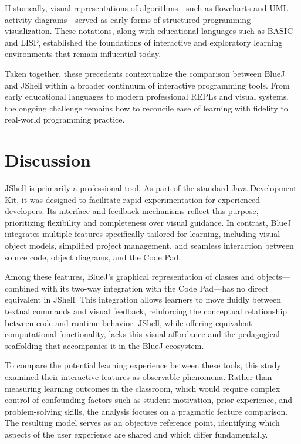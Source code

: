 \documentclass{article}
\begin{document}
Historically, visual representations of algorithms—such as flowcharts and UML activity diagrams—served as early forms of structured programming visualization. These notations, along with educational languages such as BASIC and LISP, established the foundations of interactive and exploratory learning environments that remain influential today.

Taken together, these precedents contextualize the comparison between BlueJ and JShell within a broader continuum of interactive programming tools. From early educational languages to modern professional REPLs and visual systems, the ongoing challenge remains how to reconcile ease of learning with fidelity to real-world programming practice.

\section{Discussion}

JShell is primarily a professional tool. As part of the standard Java Development Kit, it was designed to facilitate rapid experimentation for experienced developers. Its interface and feedback mechanisms reflect this purpose, prioritizing flexibility and completeness over visual guidance. In contrast, BlueJ integrates multiple features specifically tailored for learning, including visual object models, simplified project management, and seamless interaction between source code, object diagrams, and the Code Pad.

Among these features, BlueJ’s graphical representation of classes and objects—combined with its two-way integration with the Code Pad—has no direct equivalent in JShell. This integration allows learners to move fluidly between textual commands and visual feedback, reinforcing the conceptual relationship between code and runtime behavior. JShell, while offering equivalent computational functionality, lacks this visual affordance and the pedagogical scaffolding that accompanies it in the BlueJ ecosystem.

To compare the potential learning experience between these tools, this study examined their interactive features as observable phenomena. Rather than measuring learning outcomes in the classroom, which would require complex control of confounding factors such as student motivation, prior experience, and problem-solving skills, the analysis focuses on a pragmatic feature comparison. The resulting model serves as an objective reference point, identifying which aspects of the user experience are shared and which differ fundamentally.
\end{document}
